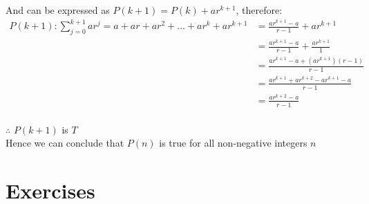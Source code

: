 \documentclass[12pt letter]{report}
\begin{document}
{  And can be expressed as $P \left( k + 1 \right) = P \left( k \right) + ar^{k + 1}  $, therefore:
  \begin{align*}
    P \left( k + 1 \right): \displaystyle\sum_{j = 0}^{k + 1}ar^{j} = a + ar + ar^2 + \ldots + ar^{k} + ar^{k + 1} &
    = \frac{ar^{k + 1} - a}{r - 1} + ar^{k + 1}                                                                                                                               \\
                                                                                                                   & = \frac{ar^{k + 1} - a}{r - 1} + \frac{ar^{k + 1}}{1}    \\
                                                                                                                   & =
    \frac{ar^{k
          + 1}
      - a +
      \left(
      ar^{k + 1}
      \right) \left(
      r - 1\right)  }{r
    - 1}                                                                                                                                                                      \\
                                                                                                                   & = \frac{ar^{k + 1} + ar^{k + 2} - ar^{k + 1} - a}{r - 1} \\
                                                                                                                   & = \frac{ar^{k
          + 2} - a}{r
    - 1}                                                                                                                                                                      \\
  \end{align*}

  \noindent $\therefore$ $P \left( k + 1 \right) $ is $T$ \\
  Hence we can conclude that $P \left( n \right) $ is true for all non-negative integers $n$
}


\section{Exercises}

\end{document}
